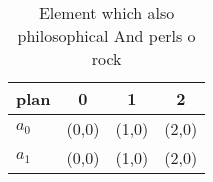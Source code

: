 \documentclass[a4paper]{article}
\begin{document}
\begin{table}
\begin{adjustbox}{width=0.9\columnwidth}
\begin{tabular}{|l|l|l|l|}
\hline
\textbf{plan} & \multicolumn{1}{c|}{\textbf{0}} & \multicolumn{1}{c|}{\textbf{1}} & \multicolumn{1}{c|}{\textbf{2}} \\ \hline
\textbf{$a_0$}  & (0,0) & (1,0) & (2,0) \\ \hline
\textbf{$a_1$}  & (0,0) & (1,0) & (2,0) \\ \hline
\end{tabular}
\end{adjustbox}
\caption{Element which also philosophical And perls o rock
}
\end{table}
\end{document}
